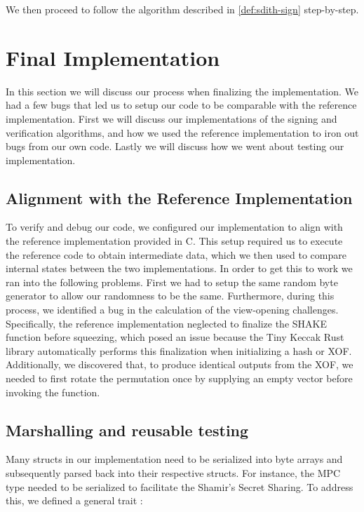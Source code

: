 \documentclass[11pt]{report}
\theoremstyle{definition}
\theoremstyle{plain}
\begin{document}
We then proceed to follow the algorithm described in \autoref{def:sdith-sign} step-by-step.

\section{Final Implementation}\label{sub:final}
In this section we will discuss our process when finalizing the implementation. We had a few bugs that led us to setup our code to be comparable with the reference implementation. First we will discuss our implementations of the signing and verification algorithms, and how we used the reference implementation to iron out bugs from our own code. Lastly we will discuss how we went about testing our implementation.


\subsection{Alignment with the Reference Implementation}\label{sub:comparison_with_spec_impl}
To verify and debug our code, we configured our implementation to align with the reference implementation provided in C. This setup required us to execute the reference code to obtain intermediate data, which we then used to compare internal states between the two implementations. In order to get this to work we ran into the following problems. First we had to setup the same random byte generator to allow our randomness to be the same. Furthermore, during this process, we identified a bug in the calculation of the view-opening challenges. Specifically, the reference implementation neglected to finalize the SHAKE function before squeezing, which posed an issue because the Tiny Keccak Rust library automatically performs this finalization when initializing a hash or XOF.
Additionally, we discovered that, to produce identical outputs from the XOF, we needed to first rotate the permutation once by supplying an empty vector before invoking the function.

\subsection{Marshalling and reusable testing}\label{sub:testing_our_implementation}

Many structs in our implementation need to be serialized into byte arrays and subsequently parsed back into their respective structs. For instance, the MPC  type needed to be serialized to facilitate the Shamir's Secret Sharing. To address this, we defined a general trait :
\end{document}
